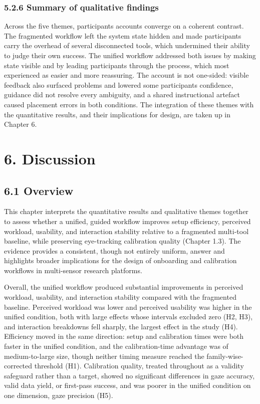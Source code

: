\documentclass[
]{article}
\begin{document}
\hypertarget{summary-of-qualitative-findings}{%
\subsubsection{5.2.6 Summary of qualitative findings}\label{summary-of-qualitative-findings}}

Across the five themes, participants\textquotesingle{} accounts converge on a coherent contrast. The fragmented workflow left the system state hidden and made participants carry the overhead of several disconnected tools, which undermined their ability to judge their own success. The unified workflow addressed both issues by making state visible and by leading participants through the process, which most experienced as easier and more reassuring. The account is not one-sided: visible feedback also surfaced problems and lowered some participants\textquotesingle{} confidence, guidance did not resolve every ambiguity, and a shared instructional artefact caused placement errors in both conditions. The integration of these themes with the quantitative results, and their implications for design, are taken up in Chapter 6.


\clearpage
\hypertarget{discussion}{%
\section{6. Discussion}\label{discussion}}

\hypertarget{overview}{%
\subsection{6.1 Overview}\label{overview}}

This chapter interprets the quantitative results and qualitative themes together to assess whether a unified, guided workflow improves setup efficiency, perceived workload, usability, and interaction stability relative to a fragmented multi-tool baseline, while preserving eye-tracking calibration quality (Chapter 1.3). The evidence provides a consistent, though not entirely uniform, answer and highlights broader implications for the design of onboarding and calibration workflows in multi-sensor research platforms.

Overall, the unified workflow produced substantial improvements in perceived workload, usability, and interaction stability compared with the fragmented baseline. Perceived workload was lower and perceived usability was higher in the unified condition, both with large effects whose intervals excluded zero (H2, H3), and interaction breakdowns fell sharply, the largest effect in the study (H4). Efficiency moved in the same direction: setup and calibration times were both faster in the unified condition, and the calibration-time advantage was of medium-to-large size, though neither timing measure reached the family-wise-corrected threshold (H1). Calibration quality, treated throughout as a validity safeguard rather than a target, showed no significant differences in gaze accuracy, valid data yield, or first-pass success, and was poorer in the unified condition on one dimension, gaze precision (H5).
\end{document}
